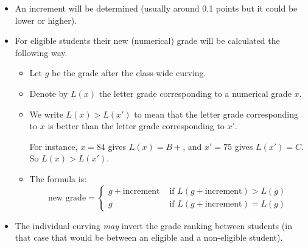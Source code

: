 \documentclass[12]{article}
\begin{document}
\begin{itemize}
\begin{itemize}
\begin{itemize}
  \item An increment will be determined (usually around 0.1 points but
    it could be lower or higher). 
  \item For eligible students their new (numerical) grade will be
    calculated the following way. 

    \begin{itemize}
    \item Let $g$ be the grade after the class-wide curving. 
    \item Denote by $L(x)$  the letter grade corresponding to a numerical
      grade $x$. 
    \item We write $L(x)>L(x')$ to mean that the letter grade corresponding to
      $x$ is better than the  letter grade corresponding to
      $x'$. 

For instance,  $x=84$ gives $L(x)=B+$, and $x'=75$ gives
$L(x')=C$. So $L(x)>L(x')$. 
\item The formula is:
    \begin{equation*}
      \text{new grade} =
      \begin{cases}
        g + \text{increment} & \text{ if } L(g +
        \text{increment})>L(g)\\
        g &\text{ if } L(g +
        \text{increment})=L(g)
      \end{cases}
    \end{equation*}
    \end{itemize}

  \item The individual curving \textit{may} invert the grade ranking
    between students (in that case that would be between an eligible
    and a non-eligible student). 
  \end{itemize}
  \end{itemize}
\end{itemize}
\end{document}
